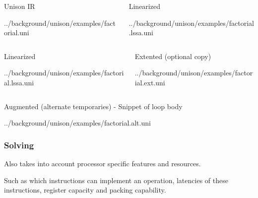 \begin{frame}
	\begin{columns}
		\begin{column}{0.5\textwidth}
			Unison IR
			
			{../background/unison/examples/factorial.uni}
		\end{column}

		\begin{column}{0.5\textwidth}
			Linearized
			
			{../background/unison/examples/factorial.lssa.uni}
		\end{column}
	\end{columns}
\end{frame}

\begin{frame}
	\begin{columns}
		\begin{column}{0.5\textwidth}
			Linearized
			
			{../background/unison/examples/factorial.lssa.uni}
		\end{column}

		\begin{column}{0.5\textwidth}
			Extented (optional copy)
			
			{../background/unison/examples/factorial.ext.uni}
		\end{column}
	\end{columns}
\end{frame}

\begin{frame}
	Augmented (alternate temporaries) - Snippet of loop body
		
		{../background/unison/examples/factorial.alt.uni}
\end{frame}

\begin{frame}
	\frametitle{Solving}

	Also takes into account processor specific features and resources.

	\vspace{0.5cm}

	Such as which instructions can implement an operation, latencies of these instructions,
	register capacity and packing capability.

\end{frame}
